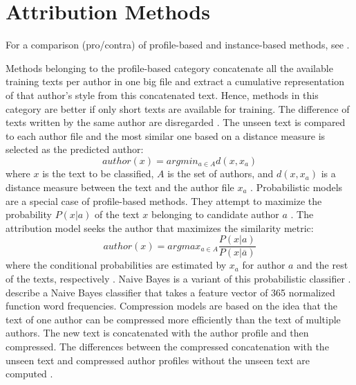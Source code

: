 \section{Attribution Methods}
\label{sec:attribution_methods}

For a comparison (pro/contra) of profile-based and instance-based methods, see \citet{stamatatos_survey_2009}.

Methods belonging to the profile-based category concatenate all the available training texts per author in one big file 
and extract a cumulative representation of that author's style from this concatenated text. %
Hence, methods in this category are better if only short texts are available for training.
The difference of texts written by the same author are disregarded \cite{stamatatos_survey_2009,elmanarelbouanani_authorship_2014,neal_surveying_2018}.
The unseen text is compared to each author file and the most similar one based on a distance measure is selected as the predicted author:
$$ author(x) = argmin_{a \in A} d(x, x_a) $$
where $x$ is the text to be classified, $A$ is the set of authors, and $d(x, x_a)$ is a distance measure 
between the text and the author file $x_a$ \cite{stamatatos_survey_2009}.
Probabilistic models are a special case of profile-based methods.
They attempt to maximize the probability $P(x|a)$ of the text $x$ belonging to candidate author $a$ \cite{stamatatos_survey_2009,neal_surveying_2018}.
The attribution model seeks the author that maximizes the similarity metric: 
$$ author(x) = argmax_{a \in A} \frac{P(x|a)}{P(x|\overline{a})} $$
where the conditional probabilities are estimated by $x_a$ for author $a$ and the rest of the texts, respectively \cite{stamatatos_survey_2009}.
Naive Bayes is a variant of this probabilistic  classifier \cite{stamatatos_survey_2009,elmanarelbouanani_authorship_2014,neal_surveying_2018}.
\citet{elmanarelbouanani_authorship_2014} describe a Naive Bayes classifier that takes a feature vector of 365 normalized function word frequencies.
Compression models are based on the idea that the text of one author can be compressed more efficiently than the text of multiple authors.
The new text is concatenated with the author profile and then compressed.
The differences between the compressed concatenation with the unseen text and compressed author profiles without the unseen text are computed 
\cite{stamatatos_survey_2009,elmanarelbouanani_authorship_2014,neal_surveying_2018}.
